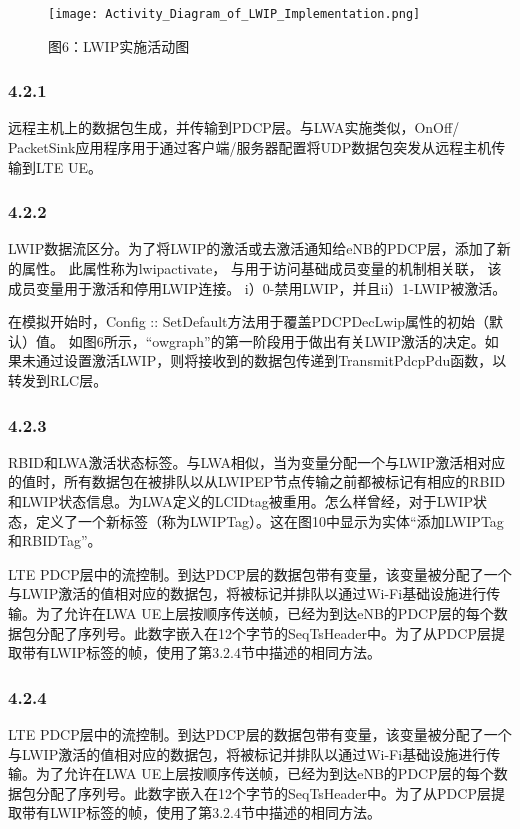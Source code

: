 \begin{figure}[htb]
  \centering
  \texttt{[image: Activity\_Diagram\_of\_LWIP\_Implementation.png]}
  \caption*{图6：LWIP实施活动图}
\end{figure}


\subsubsection*{4.2.1}
远程主机上的数据包生成，并传输到PDCP层。与LWA实施类似，OnOff/ PacketSink应用程序用于通过客户端/服务器配置将UDP数据包突发从远程主机传输到LTE UE。

\subsubsection*{4.2.2}
LWIP数据流区分。为了将LWIP的激活或去激活通知给eNB的PDCP层，添加了新的属性。
此属性称为lwipactivate，
与用于访问基础成员变量的机制相关联，
该成员变量用于激活和停用LWIP连接。
i）0-禁用LWIP，并且ii）1-LWIP被激活。

在模拟开始时，Config :: SetDefault方法用于覆盖PDCPDecLwip属性的初始（默认）值。
如图6所示，“owgraph”的第一阶段用于做出有关LWIP激活的决定。如果未通过设置激活LWIP，则将接收到的数据包传递到TransmitPdcpPdu函数，以转发到RLC层。

\subsubsection*{4.2.3}
RBID和LWA激活状态标签。与LWA相似，当为变量分配一个与LWIP激活相对应的值时，所有数据包在被排队以从LWIPEP节点传输之前都被标记有相应的RBID和LWIP状态信息。为LWA定义的LCIDtag被重用。怎么样曾经，对于LWIP状态，定义了一个新标签（称为LWIPTag）。这在图10中显示为实体“添加LWIPTag和RBIDTag”。

LTE PDCP层中的流控制。到达PDCP层的数据包带有变量，该变量被分配了一个与LWIP激活的值相对应的数据包，将被标记并排队以通过Wi-Fi基础设施进行传输。为了允许在LWA UE上层按顺序传送帧，已经为到达eNB的PDCP层的每个数据包分配了序列号。此数字嵌入在12个字节的SeqTsHeader中。为了从PDCP层提取带有LWIP标签的帧，使用了第3.2.4节中描述的相同方法。

\subsubsection*{4.2.4}
LTE 
PDCP层中的流控制。到达PDCP层的数据包带有变量，该变量被分配了一个与LWIP激活的值相对应的数据包，将被标记并排队以通过Wi-Fi基础设施进行传输。为了允许在LWA UE上层按顺序传送帧，已经为到达eNB的PDCP层的每个数据包分配了序列号。此数字嵌入在12个字节的SeqTsHeader中。为了从PDCP层提取带有LWIP标签的帧，使用了第3.2.4节中描述的相同方法。

